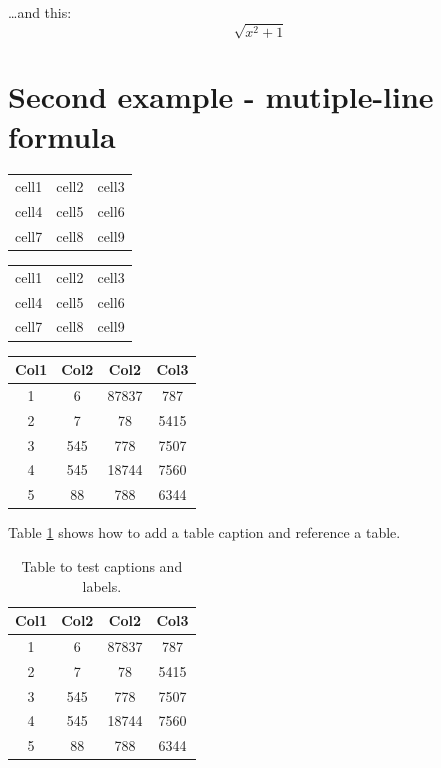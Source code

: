 \documentclass[12pt, letterpaper]{article}
\begin{document}
\ldots and this:
\begin{equation*}
    \sqrt{x^2+1}
\end{equation*}


\section*{Second example - mutiple-line formula}

\begin{center}
    \begin{tabular}{c c c}
        cell1 & cell2 & cell3 \\ 
        cell4 & cell5 & cell6 \\  
        cell7 & cell8 & cell9    
    \end{tabular}
    \begin{tabular}{|c|c|c|} 
        \hline
        cell1 & cell2 & cell3 \\ 
        cell4 & cell5 & cell6 \\ 
        cell7 & cell8 & cell9 \\ 
        \hline
    \end{tabular}

\end{center}

\begin{center}
    \begin{tabular}{||c c c c||} 
    \hline
    Col1 & Col2 & Col2 & Col3 \\ [0.5ex] 
    \hline\hline
    1 & 6 & 87837 & 787 \\ 
    \hline
    2 & 7 & 78 & 5415 \\
    \hline
    3 & 545 & 778 & 7507 \\
    \hline
    4 & 545 & 18744 & 7560 \\
    \hline
    5 & 88 & 788 & 6344 \\ [1ex] 
    \hline
    \end{tabular}
\end{center}

Table \ref{table:data} shows how to add a table caption and reference a table.
\begin{table}[h!]
    \centering
    \begin{tabular}{||c c c c||} 
    \hline
    Col1 & Col2 & Col2 & Col3 \\ [0.5ex] 
    \hline\hline
    1 & 6 & 87837 & 787 \\ 
    2 & 7 & 78 & 5415 \\
    3 & 545 & 778 & 7507 \\
    4 & 545 & 18744 & 7560 \\
    5 & 88 & 788 & 6344 \\ [1ex] 
    \hline
    \end{tabular}
    \caption{Table to test captions and labels.}
\label{table:data}
\end{table}
\end{document}
